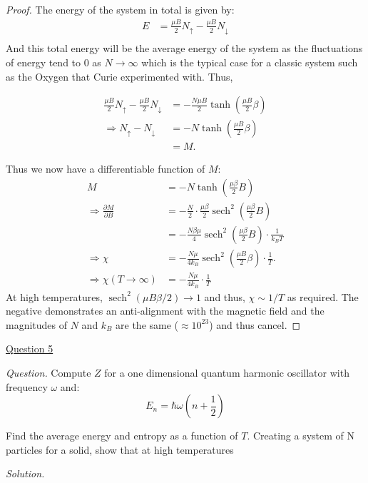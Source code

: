 \documentclass[11pt]{article}
\DeclareMathOperator{\sech}{sech}
\begin{document}
\begin{proof}
The energy of the system in total is given by:
    \begin{equation}
        \begin{aligned}
            E &= \frac{\mu B}{2} N_{\uparrow} - \frac{\mu B}{2}N_{\downarrow} \\
        \end{aligned}
    \end{equation}
And this total energy will be the average energy of the system as the fluctuations of energy tend to 0 as $N \to \infty$ which is the typical case for a classic system such as the Oxygen that Curie experimented with. Thus,

\begin{equation}
    \begin{aligned}
        \frac{\mu B}{2} N_{\uparrow} - \frac{\mu B}{2}N_{\downarrow} &= -\frac{N\mu B}{2} \tanh\left(\frac{\mu B}{2}\beta\right) \\
        \Rightarrow N_{\uparrow} - N_{\downarrow} &= -N \tanh\left(\frac{\mu B}{2} \beta\right) \\
        &= M.
    \end{aligned}
\end{equation}

Thus we now have a differentiable function of $M$:
\begin{equation}
    \begin{aligned}
        M &= -N \tanh\left(\frac{\mu \beta}{2} B \right) \\
        \Rightarrow \frac{\partial M}{\partial B} &= - \frac{N}{2} \cdot \frac{\mu \beta}{2}\sech^2 \left(\frac{\mu \beta }{2}B\right) \\
        &= -\frac{N \beta\mu}{4} \sech^2\left(\frac{\mu \beta}{2} B\right) \cdot \frac{1}{k_BT} \\
        \Rightarrow \chi &= -\frac{N\mu}{4k_B} \sech^2\left(\frac{\mu B}{2}\beta \right) \cdot \frac{1}{T}. \\
        \Rightarrow \chi (T\to \infty) &= - \frac{N \mu}{4k_B} \cdot \frac{1}{T}
    \end{aligned}
\end{equation}
At high temperatures, $\sech^2\left(\mu B\beta/2 \right) \to 1$ and thus, $\chi \sim 1/T$ as required. The negative demonstrates an anti-alignment with the magnetic field and the magnitudes of $N$ and $k_B$ are the same ($\approx 10^{23}$) and thus cancel.
\end{proof}

\underline{Question 5}

\textit{Question.} Compute $Z$ for a one dimensional quantum harmonic oscillator with frequency $\omega$ and:
\begin{equation}
    E_n = \hbar \omega \left(n +\frac{1}{2}\right)
\end{equation}

Find the average energy and entropy as a function of $T$. Creating a system of N particles for a solid, show that at high temperatures 

\textit{Solution.}
\end{document}

